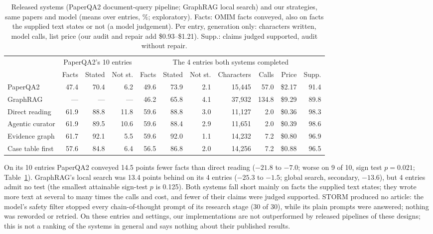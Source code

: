 \documentclass{article} %
\begin{document}
\begin{table}[t]
\caption{Released systems (PaperQA2 document-query pipeline; GraphRAG local search) and our strategies, same papers and model (means over entries, \%; exploratory). Facts: OMIM facts conveyed, also on facts the supplied text states or not (a model judgement). Per entry, generation only: characters written, model calls, list price (our audit and repair add \$0.93--\$1.21). Supp.: claims judged supported, audit without repair.}
\label{tab:released}
\begin{center}
\footnotesize
\setlength{\tabcolsep}{3.2pt}
\begin{tabular}{lrrrrrrrrrr}
\toprule
 & \multicolumn{3}{c}{PaperQA2's 10 entries} & \multicolumn{7}{c}{The 4 entries both systems completed} \\
\cmidrule(lr){2-4}\cmidrule(lr){5-11}
 & Facts & Stated & Not st. & Facts & Stated & Not st. & Characters & Calls & Price & Supp. \\
\midrule
PaperQA2 & 47.4 & 70.4 & 6.2 & 49.6 & 73.9 & 2.1 & 15,445 & 57.0 & \$2.17 & 91.4 \\
GraphRAG & --- & --- & --- & 46.2 & 65.8 & 4.1 & 37,932 & 134.8 & \$9.29 & 89.8 \\
Direct reading & 61.9 & 88.8 & 11.8 & 59.6 & 88.8 & 3.0 & 11,127 & 2.0 & \$0.36 & 98.3 \\
Agentic curator & 61.9 & 89.5 & 10.6 & 59.6 & 88.4 & 2.9 & 11,651 & 2.0 & \$0.39 & 98.6 \\
Evidence graph & 61.7 & 92.1 & 5.5 & 59.6 & 92.0 & 1.1 & 14,232 & 7.2 & \$0.80 & 96.9 \\
Case table first & 57.6 & 84.8 & 6.4 & 56.5 & 86.8 & 2.0 & 14,256 & 7.2 & \$0.88 & 96.5 \\
\bottomrule
\end{tabular}
\end{center}
\end{table}

On its 10 entries PaperQA2 conveyed 14.5 points fewer facts than direct reading ($-21.8$ to $-7.0$; worse on 9 of 10, sign test $p=0.021$; Table~\ref{tab:released}). GraphRAG's local search was 13.4 points behind on its 4 entries ($-25.3$ to $-1.5$; global search, secondary, $-13.6$), but 4 entries admit no test (the smallest attainable sign-test $p$ is 0.125). Both systems fall short mainly on facts the supplied text states; they wrote more text at several to many times the calls and cost, and fewer of their claims were judged supported. STORM produced no article: the model's safety filter stopped every chain-of-thought prompt of its research stage (30 of 30), while its plain prompts were answered; nothing was reworded or retried. On these entries and settings, our implementations are not outperformed by released pipelines of these designs; this is not a ranking of the systems in general and says nothing about their published results.
\end{document}
